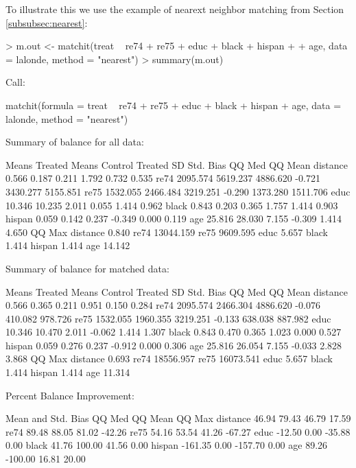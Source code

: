 \documentclass[oneside,letterpaper,titlepage]{article}
\begin{document}
\begin{enumerate}
  To illustrate this we use the example of nearext neighbor matching from Section \ref{subsubsec:nearest}:
\begin{Schunk}
\begin{Sinput}
> m.out <- matchit(treat ~ re74 + re75 + educ + black + hispan + 
+     age, data = lalonde, method = "nearest")
> summary(m.out)
\end{Sinput}
\begin{Soutput}
Call:

matchit(formula = treat ~ re74 + re75 + educ + black + hispan + 
    age, data = lalonde, method = "nearest")



Summary of balance for all data:

         Means Treated Means Control Treated SD Std. Bias   QQ Med  QQ Mean
distance         0.566         0.187      0.211     1.792    0.732    0.535
re74          2095.574      5619.237   4886.620    -0.721 3430.277 5155.851
re75          1532.055      2466.484   3219.251    -0.290 1373.280 1511.706
educ            10.346        10.235      2.011     0.055    1.414    0.962
black            0.843         0.203      0.365     1.757    1.414    0.903
hispan           0.059         0.142      0.237    -0.349    0.000    0.119
age             25.816        28.030      7.155    -0.309    1.414    4.650
            QQ Max
distance     0.840
re74     13044.159
re75      9609.595
educ         5.657
black        1.414
hispan       1.414
age         14.142

Summary of balance for matched data:

         Means Treated Means Control Treated SD Std. Bias  QQ Med QQ Mean
distance         0.566         0.365      0.211     0.951   0.150   0.284
re74          2095.574      2466.304   4886.620    -0.076 410.082 978.726
re75          1532.055      1960.355   3219.251    -0.133 638.038 887.982
educ            10.346        10.470      2.011    -0.062   1.414   1.307
black            0.843         0.470      0.365     1.023   0.000   0.527
hispan           0.059         0.276      0.237    -0.912   0.000   0.306
age             25.816        26.054      7.155    -0.033   2.828   3.868
            QQ Max
distance     0.693
re74     18556.957
re75     16073.541
educ         5.657
black        1.414
hispan       1.414
age         11.314

Percent Balance Improvement:

         Mean and Std. Bias  QQ Med QQ Mean QQ Max
distance              46.94   79.43   46.79  17.59
re74                  89.48   88.05   81.02 -42.26
re75                  54.16   53.54   41.26 -67.27
educ                 -12.50    0.00  -35.88   0.00
black                 41.76  100.00   41.56   0.00
hispan              -161.35    0.00 -157.70   0.00
age                   89.26 -100.00   16.81  20.00


\end{Soutput}
\end{Schunk}
\end{enumerate}
\end{document}
